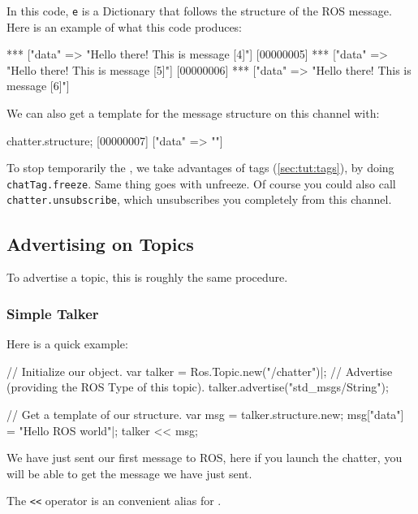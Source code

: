 In this code, \lstinline{e} is a Dictionary that follows the structure of
the ROS message. Here is an example of what this code produces:

\begin{urbiunchecked}
[00000004] *** ["data" => "Hello there! This is message [4]"]
[00000005] *** ["data" => "Hello there! This is message [5]"]
[00000006] *** ["data" => "Hello there! This is message [6]"]
\end{urbiunchecked}

We can also get a template for the message structure on this channel with:

\begin{urbiunchecked}
chatter.structure;
[00000007] ["data" => ""]
\end{urbiunchecked}

To stop temporarily the , we take advantages of tags
(\autoref{sec:tut:tags}), by doing \lstinline{chatTag.freeze}.  Same thing
goes with unfreeze.  Of course you could also call
\lstinline{chatter.unsubscribe}, which unsubscribes you completely from this
channel.


\subsection{Advertising on Topics}

To advertise a topic, this is roughly the same procedure.


\subsubsection{Simple Talker}

Here is a quick example:

\begin{urbiunchecked}
// Initialize our object.
var talker = Ros.Topic.new("/chatter")|;
// Advertise (providing the ROS Type of this topic).
talker.advertise("std_msgs/String");

// Get a template of our structure.
var msg = talker.structure.new;
msg["data"] = "Hello ROS world"|;
talker << msg;
\end{urbiunchecked}

We have just sent our first message to ROS, here if you launch the chatter,
you will be able to get the message we have just sent.

The \lstinline{<<} operator is an convenient alias for
.



